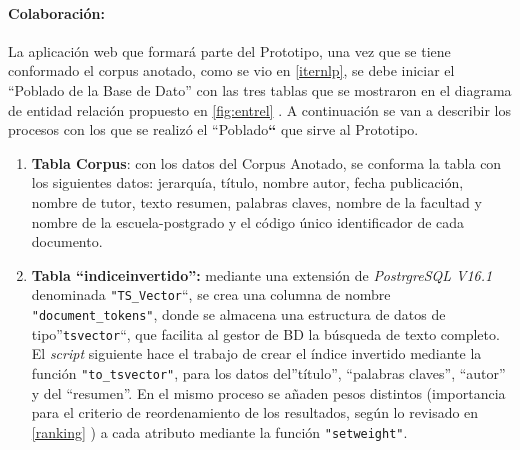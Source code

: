 \documentclass[
  12pt,
  openany]{book}
\begin{document}
\hypertarget{colaboraciuxf3n-6}{%
\paragraph{Colaboración:}\label{colaboraciuxf3n-6}}

La aplicación web que formará parte del Prototipo, una vez que se tiene conformado el corpus anotado, como se vio en \ref{iternlp}, se debe iniciar el ``Poblado de la Base de Dato'' con las tres tablas que se mostraron en el diagrama de entidad relación propuesto en \ref{fig:entrel} . A continuación se van a describir los procesos con los que se realizó el ``Poblado\textbf{``} que sirve al Prototipo.

\begin{enumerate}
\def\labelenumi{\arabic{enumi}.}
\item
  \textbf{Tabla Corpus}: con los datos del Corpus Anotado, se conforma la tabla con los siguientes datos: jerarquía, título, nombre autor, fecha publicación, nombre de tutor, texto resumen, palabras claves, nombre de la facultad y nombre de la escuela-postgrado y el código único identificador de cada documento.
\item
  \textbf{Tabla ``indiceinvertido'':} mediante una extensión de \emph{PostrgreSQL V16.1} denominada \texttt{"TS\_Vector}``, se crea una columna de nombre \texttt{"document\_tokens"}, donde se almacena una estructura de datos de tipo''\texttt{tsvector}``, que facilita al gestor de BD la búsqueda de texto completo. El \emph{script} siguiente hace el trabajo de crear el índice invertido mediante la función \texttt{"to\_tsvector"}, para los datos del''título'', ``palabras claves'', ``autor'' y del ``resumen''. En el mismo proceso se añaden pesos distintos (importancia para el criterio de reordenamiento de los resultados, según lo revisado en \ref{ranking} ) a cada atributo mediante la función \texttt{"setweight"}.

  \newpage


\end{enumerate}
\end{document}
